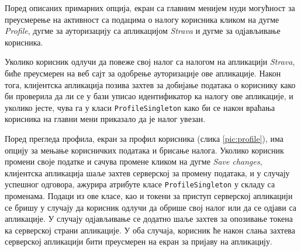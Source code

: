 \documentclass[12pt,oneside]{memoir}
\begin{document}
Поред описаних примарних опција, екран са главним менијем нуди могућност за преусмерење на активност са подацима о налогу корисника кликом на дугме \textit{Profile}, дугме за ауторизацију са апликацијом \textit{Strava} и дугме за одјављивање корисника.

Уколико корисник одлучи да повеже свој налог са налогом на апликацији \textit{Strava}, биће преусмерен на веб сајт за одобрење ауторизације ове апликације. Након тога, клијентска апликација позива захтев за добијање података о кориснику како би проверила да ли се у бази уписао идентификатор ка налогу ове апликације, и уколико јесте, чува га у класи \texttt{ProfileSingleton} како би се након враћања корисника на главни мени приказало да је налог увезан.


Поред прегледа профила, екран за профил корисника (слика \ref{pic:profile}), има опцију за мењање корисничких података и брисање налога. Уколико корисник промени своје податке и сачува промене кликом на дугме \textit{Save changes}, клијентска апликација шаље захтев серверској за промену података, и у случају успешног одговора, ажурира атрибуте класе \texttt{ProfileSingleton} у складу са променама. Подаци из ове класе, као и токени за приступ серверској апликацији се бришу у случају да корисник одлучи да обрише свој налог или да се одјави са апликације. У случају одјављивање се додатно шаље захтев за опозивање токена ка серверској страни апликације. У оба случаја, корисник ће након слања захтева серверској апликацији бити преусмерен на екран за пријаву на апликацију.
\end{document}
